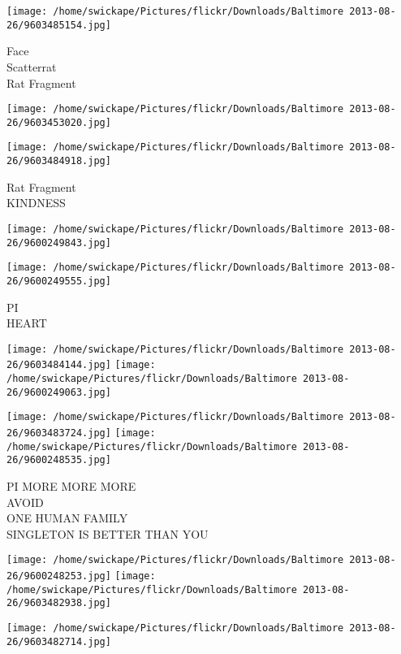 \documentclass[10pt,letterpaper]{article}
\begin{document}
\texttt{[image: /home/swickape/Pictures/flickr/Downloads/Baltimore 2013-08-26/9603485154.jpg]}

Face\\
Scatterrat\\
Rat Fragment\\
\pagebreak

\texttt{[image: /home/swickape/Pictures/flickr/Downloads/Baltimore 2013-08-26/9603453020.jpg]}

\vspace{0.25in}
\texttt{[image: /home/swickape/Pictures/flickr/Downloads/Baltimore 2013-08-26/9603484918.jpg]}

Rat Fragment\\
KINDNESS\\
\pagebreak

\texttt{[image: /home/swickape/Pictures/flickr/Downloads/Baltimore 2013-08-26/9600249843.jpg]}

\vspace{0.25in}
\texttt{[image: /home/swickape/Pictures/flickr/Downloads/Baltimore 2013-08-26/9600249555.jpg]}

PI\\
HEART\\
\pagebreak

\texttt{[image: /home/swickape/Pictures/flickr/Downloads/Baltimore 2013-08-26/9603484144.jpg]}
\texttt{[image: /home/swickape/Pictures/flickr/Downloads/Baltimore 2013-08-26/9600249063.jpg]}

\texttt{[image: /home/swickape/Pictures/flickr/Downloads/Baltimore 2013-08-26/9603483724.jpg]}
\texttt{[image: /home/swickape/Pictures/flickr/Downloads/Baltimore 2013-08-26/9600248535.jpg]}

PI MORE MORE MORE\\
AVOID\\
ONE HUMAN FAMILY\\
SINGLETON IS BETTER THAN YOU\\
\pagebreak

\texttt{[image: /home/swickape/Pictures/flickr/Downloads/Baltimore 2013-08-26/9600248253.jpg]}
\texttt{[image: /home/swickape/Pictures/flickr/Downloads/Baltimore 2013-08-26/9603482938.jpg]}

\vspace{0.25in}
\texttt{[image: /home/swickape/Pictures/flickr/Downloads/Baltimore 2013-08-26/9603482714.jpg]}
\end{document}
